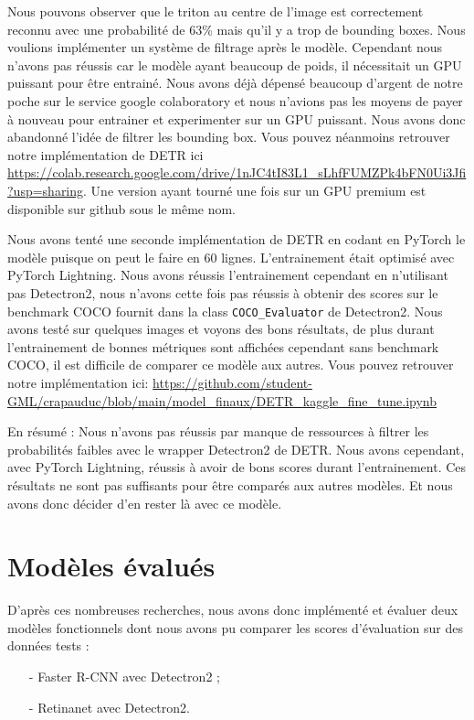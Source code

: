 Nous pouvons observer que le triton au centre de l'image est correctement reconnu avec une probabilité de 63\% mais qu'il y a trop de bounding boxes. Nous voulions implémenter un système de filtrage après le modèle. Cependant nous n'avons pas réussis car le modèle ayant beaucoup de poids, il nécessitait un GPU puissant pour être entrainé. Nous avons déjà dépensé beaucoup d'argent de notre poche sur le service google colaboratory et nous n'avions pas les moyens de payer à nouveau pour entrainer et experimenter sur un GPU puissant. Nous avons donc abandonné l'idée de filtrer les bounding box. Vous pouvez néanmoins retrouver notre implémentation de DETR ici \url{https://colab.research.google.com/drive/1nJC4tI83L1_sLhfFUMZPk4bFN0Ui3Jfi?usp=sharing}. Une version ayant tourné une fois sur un GPU premium est disponible sur github sous le même nom.

Nous avons tenté une seconde implémentation de DETR en codant en PyTorch le modèle puisque on peut le faire en 60 lignes. L'entrainement était optimisé avec PyTorch Lightning. Nous avons réussis l'entrainement cependant en n'utilisant pas Detectron2, nous n'avons cette fois pas réussis à obtenir des scores sur le benchmark COCO fournit dans la class \verb|COCO_Evaluator| de Detectron2. Nous avons testé sur quelques images et voyons des bons résultats, de plus durant l'entrainement de bonnes métriques sont affichées cependant sans benchmark COCO, il est difficile de comparer ce modèle aux autres. Vous pouvez retrouver notre implémentation ici: \url{https://github.com/student-GML/crapauduc/blob/main/model_finaux/DETR_kaggle_fine_tune.ipynb}

En résumé : Nous n'avons pas réussis par manque de ressources à filtrer les probabilités faibles avec le wrapper Detectron2 de DETR. Nous avons cependant, avec PyTorch Lightning, réussis à avoir de bons scores durant l'entrainement. Ces résultats ne sont pas suffisants pour être comparés aux autres modèles. Et nous avons donc décider d'en rester là avec ce modèle.

\section{Modèles évalués}
D'après ces nombreuses recherches, nous avons donc implémenté et évaluer deux modèles fonctionnels dont nous avons pu comparer les scores d'évaluation sur des données tests : 

\begin{itemize}
    \item[-] Faster R-CNN avec Detectron2 ;
    \item[-] Retinanet avec Detectron2.
\end{itemize}